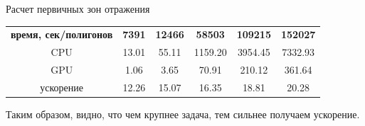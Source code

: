 \begin{center}
Расчет первичных зон отражения
\begin{tabular}{cccccc}
\textbf{время, сек/полигонов}& \textbf{7391}& \textbf{12466}& \textbf{58503}& \textbf{109215}	&\textbf{152027} 	\\
CPU 						& 13.01				& 55.11				& 1159.20			& 3954.45					& 7332.93			\\
GPU 						& 1.06				& 3.65				& 70.91				& 210.12						& 361.64				\\
ускорение 				& 12.26				& 15.07				& 16.35				& 18.81						& 20.28				\\
\end{tabular}
\end{center}

Таким образом, видно, что чем крупнее задача, тем сильнее получаем ускорение. 



